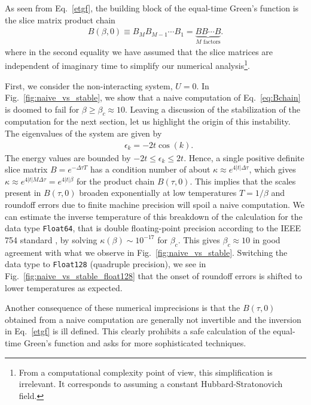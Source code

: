 \documentclass[submission, Phys]{SciPost}
\begin{document}
As seen from Eq.~\eqref{etgf}, the building block of the equal-time Green's function is the slice matrix product chain
\begin{align}
	B(\beta, 0) \equiv B_M B_{M-1} \cdots B_1 = \underbrace{B B \cdots B}_{M \textrm{ factors}}. \label{eq:Bchain}
\end{align}
where in the second equality  we have assumed that the slice matrices are independent of imaginary time to simplify our numerical analysis\footnote{From a computational complexity point of view, this simplification is irrelevant. It corresponds to assuming a constant Hubbard-Stratonovich field.}.

First, we consider the non-interacting system, $U=0$. In Fig.~\ref{fig:naive_vs_stable}, we show that a naive computation of Eq.~\ref{eq:Bchain} is doomed to fail for $\beta \geq \beta_c \approx 10$. Leaving a discussion of the stabilization of the computation for the next section, let us highlight the origin of this instability. The eigenvalues of the system are given by
\begin{align}
	&\epsilon_k = -2t\cos(k).
\end{align}
The energy values are bounded by $-2t \leq \epsilon_k \leq 2t$. Hence, a single positive definite slice matrix $B = e^{-\Delta \tau T}$ has a condition number of about $\kappa \approx e^{4|t|\Delta \tau}$, which gives $\kappa \approx e^{4|t|M\Delta \tau} = e^{4|t|\beta}$ for  the product chain $B(\tau, 0)$. This implies that the scales present in $B(\tau, 0)$ broaden exponentially at low temperatures $T=1/\beta$ and roundoff errors due to finite machine precision will spoil a naive computation. We can estimate the inverse temperature of this breakdown of the calculation for the data type \texttt{Float64}, that is double floating-point precision according to the IEEE 754 standard \cite{Goldberg1991}, by solving $\kappa(\beta) \sim 10^{-17}$ for $\beta_c$. This gives $\beta_c \approx 10$ in good agreement with what we observe in Fig.~\ref{fig:naive_vs_stable}. Switching the data type to \texttt{Float128} (quadruple precision), we see in Fig.~\ref{fig:naive_vs_stable_float128} that the onset of roundoff errors is shifted to lower temperatures as expected.

Another consequence of these numerical imprecisions is that the $B(\tau, 0)$ obtained from a naive computation are generally not invertible and the inversion in Eq.~\ref{etgf} is ill defined. This clearly prohibits a safe calculation of the equal-time Green's function and asks for more sophisticated techniques.
\end{document}
